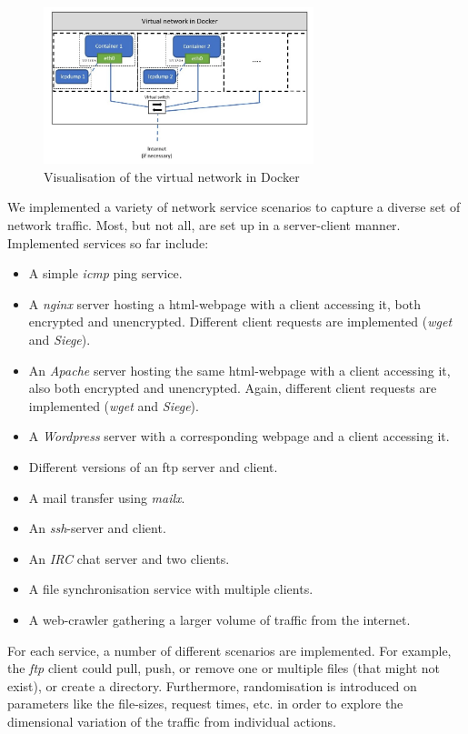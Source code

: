 \documentclass[a4paper,12pt,twoside]{report}
\begin{document}
\begin{figure}
\centering
\includegraphics[width=0.7\textwidth]{images/Dockernet.jpg}
\caption{Visualisation of the virtual network in Docker}\label{docker}
\end{figure}

We implemented a variety of network service  scenarios to capture a diverse set of network traffic. Most, but not all, are set up in a server-client manner. Implemented services so far include:

\begin{itemize}
\item A simple \textit{icmp} ping service.
\item A \textit{nginx} server hosting a html-webpage with a client accessing it, both encrypted and unencrypted. Different client requests are implemented (\textit{wget} and \textit{Siege}).
\item An \textit{Apache} server hosting the same html-webpage with a client accessing it, also both encrypted and unencrypted. Again, different client requests are implemented (\textit{wget} and \textit{Siege}).
\item A \textit{Wordpress} server with a corresponding webpage and a client accessing it.
\item Different versions of an ftp server and client.
\item A mail transfer using \textit{mailx}.
\item An \textit{ssh}-server and client.
\item An \textit{IRC} chat server and two clients.
\item A file synchronisation service with multiple clients.
\item A web-crawler gathering a larger volume of traffic from the internet.
\end{itemize}

For each service, a number of different scenarios are implemented. For example, the \textit{ftp} client could pull, push, or remove one or multiple files (that might not exist), or create a directory. Furthermore, randomisation is introduced on parameters like the file-sizes, request times, etc. in order to explore the dimensional variation of the traffic from individual actions.
\end{document}

